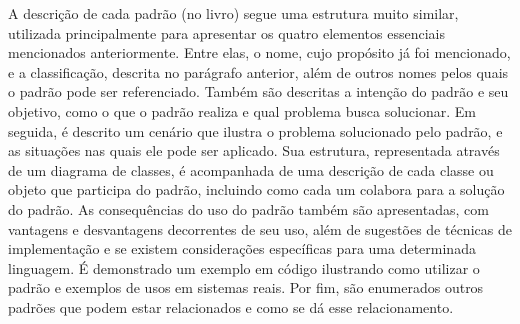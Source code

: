 A descrição de cada padrão (no livro) segue uma estrutura 
muito similar, utilizada principalmente para apresentar 
os quatro elementos essenciais mencionados anteriormente. 
Entre elas, o nome, cujo propósito já foi mencionado, e 
a classificação, descrita no parágrafo anterior, além de 
outros nomes pelos quais o padrão pode ser referenciado. 
Também são descritas a intenção do padrão e seu objetivo, 
como o que o padrão realiza e qual problema busca 
solucionar. Em seguida, é descrito um cenário que 
ilustra o problema solucionado pelo padrão, e as 
situações nas quais ele pode ser aplicado. Sua estrutura, 
representada através de um diagrama de classes, é 
acompanhada de uma descrição de cada classe ou objeto 
que participa do padrão, incluindo como cada um 
colabora para a solução do padrão. As consequências do 
uso do padrão também são apresentadas, com vantagens e 
desvantagens decorrentes de seu uso, além de sugestões de 
técnicas de implementação e se existem considerações 
específicas para uma determinada linguagem. É 
demonstrado um exemplo 
em código ilustrando como utilizar o padrão e exemplos 
de usos em sistemas reais. Por fim, são enumerados 
outros padrões que podem estar relacionados e como se dá 
esse relacionamento.

